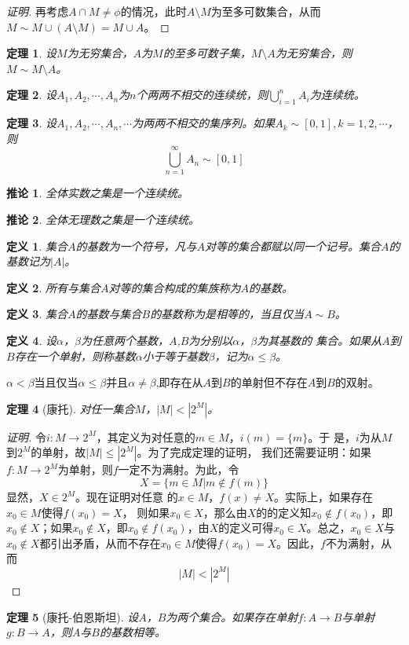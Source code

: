 \documentclass{article}
\newtheorem{Def}{定义}
\newtheorem{Thm}{定理}
\newtheorem{Cor}{推论}
\begin{document}
\begin{CJK*}{UTF8}{gbsn}
\begin{proof}[证明]
    再考虑$A\cap M\neq \phi$的情况，此时$A\setminus M$为至多可数集合，从而$M\sim M\cup(A\setminus M)=M\cup A$。
  \end{proof}
  \begin{Thm}
    设$M$为无穷集合，$A$为$M$的至多可数子集，$M\setminus A$为无穷集合，则$M \sim M\setminus A$。
  \end{Thm}
  \begin{Thm}
    设$A_1, A_2, \cdots, A_n$为$n$个两两不相交的连续统，则$\bigcup_{i=1}^nA_i$为连续统。
  \end{Thm}
  \begin{Thm}
    设$A_1, A_2, \cdots, A_n, \cdots$为两两不相交的集序列。如果$A_k \sim [0,1], k = 1, 2, \cdots$，则
    \[\bigcup_{n=1}^{\infty}A_n \sim [0,1]\]
  \end{Thm}
 \begin{Cor}
   全体实数之集是一个连续统。
 \end{Cor}
 \begin{Cor}
   全体无理数之集是一个连续统。
 \end{Cor}
  \begin{Def}
    集合$A$的基数为一个符号，凡与$A$对等的集合都赋以同一个记号。集合$A$的基数记为$|A|$。
  \end{Def}
  \begin{Def}
    所有与集合$A$对等的集合构成的集族称为$A$的基数。
  \end{Def}
    \begin{Def}
    集合$A$的基数与集合$B$的基数称为是相等的，当且仅当$A \sim B$。
  \end{Def}
  \begin{Def}
    设$\alpha$，$\beta$为任意两个基数，$A$,$B$为分别以$\alpha$，$\beta$为其基数的
    集合。如果从$A$到$B$存在一个单射，则称基数$\alpha$小于等于基数$\beta$，记为$\alpha \leq \beta$。
  \end{Def}


  $\alpha < \beta$当且仅当$\alpha \leq \beta$并且$\alpha \neq \beta$,即存在从$A$到$B$的单射但不存在$A$到$B$的双射。

  \begin{Thm}[康托]
    对任一集合$M$，$|M| < |2^{M}|$。
  \end{Thm}
  \begin{proof}[证明]
    令$i:M\to
    2^M$，其定义为对任意的$m\in M$，$i(m)=\{m\}$。于
    是，$i$为从$M$到$2^M$的单射，故$|M|\leq |2^M|$。为了完成定理的证明，
    我们还需要证明：如果$f:M\to 2^M$为单射，则$f$一定不为满射。为此，令
    \[X=\{m\in M|m \notin f(m)\}\]显然，$X\in 2^M$。现在证明对任意
    的$x\in M$，$f(x)\neq X$。实际上，如果存在$x_0\in M$使得$f(x_0)=X$，
    则如果$x_0\in X$，那么由$X$的的定义知$x_0\notin
    f(x_0)$，即$x_0\notin X$；如果$x_0\notin X$，即$x_0\notin f(x_0)$，由$X$的定义可得$x_0\in X$。总之，$x_0\in X$与$x_0\notin X$都引出矛盾，从而不存在$x_0\in M$使得$f(x_0)=X$。因此，$f$不为满射，从而
    \[|M|<|2^M|\]
  \end{proof}
  \begin{Thm}[康托-伯恩斯坦]
    设$A$，$B$为两个集合。如果存在单射$f:A\to B$与单射$g:B\to A$，则$A$与$B$的基数相等。
  \end{Thm}


\end{CJK*}
\end{document}
